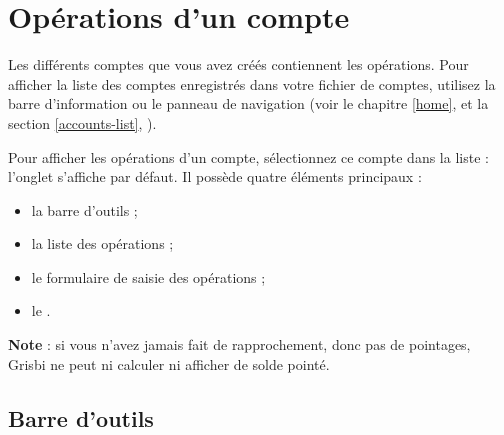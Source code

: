 
\chapter{Opérations d'un compte\label{transactions}}

Les différents comptes que vous avez créés contiennent les opérations. Pour afficher la liste des comptes enregistrés dans votre fichier de comptes, utilisez la barre d'information ou le panneau de navigation (voir le chapitre \vref{home},  et la section \vref{accounts-list}, ).

Pour afficher les opérations d'un compte, sélectionnez ce compte dans la liste : l'onglet  s'affiche par défaut. Il possède quatre éléments principaux :

\begin{itemize}
	 \item la barre d'outils ;
	 \item la liste des opérations ;
	 \item le formulaire de saisie des opérations ;
	 \item le .
\end{itemize}

\textbf{Note} : si vous n'avez jamais fait de rapprochement, donc pas de pointages, Grisbi ne peut ni calculer ni afficher de solde pointé.


\section{Barre d'outils\label{transactions-functions}}


